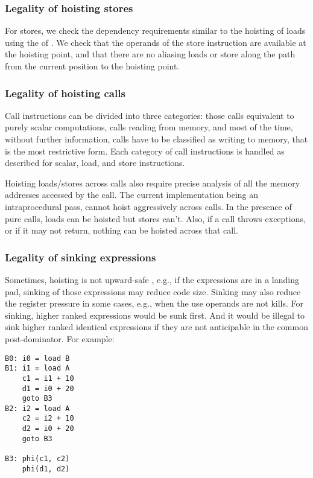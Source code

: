 \documentclass[acmlarge,review,anonymous]{acmart}\settopmatter{printfolios=true}
\begin{document}
\subsubsection{Legality of hoisting stores}
For stores, we check the dependency requirements similar to the hoisting of
loads using the \MemorySSA{} of \LLVM{}. We check that the operands of the store
instruction are available at the hoisting point, and that there are no aliasing
loads or store along the path from the current position to the hoisting point.

\subsubsection{Legality of hoisting calls}
Call instructions can be divided into three categories: those calls equivalent
to purely scalar computations, calls reading from memory, and most of the time,
without further information, calls have to be classified as writing to memory,
that is the most restrictive form.  Each category of call instructions is
handled as described for scalar, load, and store instructions.

Hoisting loads/stores across calls also require precise analysis of all the
memory addresses accessed by the call. The current implementation being an
intraprocedural pass, cannot hoist aggressively across calls. In the presence of
pure calls, loads can be hoisted but stores can't. Also, if a call throws
exceptions, or if it may not return, nothing can be hoisted across that call.

\subsubsection{Legality of sinking expressions}
\label{subsec:legality-sink}
Sometimes, hoisting is not upward-safe \cite{click1995global}, e.g., if the
expressions are in a landing pad, sinking of those expressions
may reduce code size. Sinking may also reduce the register pressure in some
cases, e.g., when the use operands are not kills. For sinking, higher ranked
expressions would be sunk first. And it would be illegal to sink higher ranked
identical expressions if they are not anticipable in the common
post-dominator. For example:

\begin{verbatim}
B0: i0 = load B
B1: i1 = load A
    c1 = i1 + 10
    d1 = i0 + 20
    goto B3
B2: i2 = load A
    c2 = i2 + 10
    d2 = i0 + 20
    goto B3

B3: phi(c1, c2)
    phi(d1, d2)
\end{verbatim}
\end{document}
